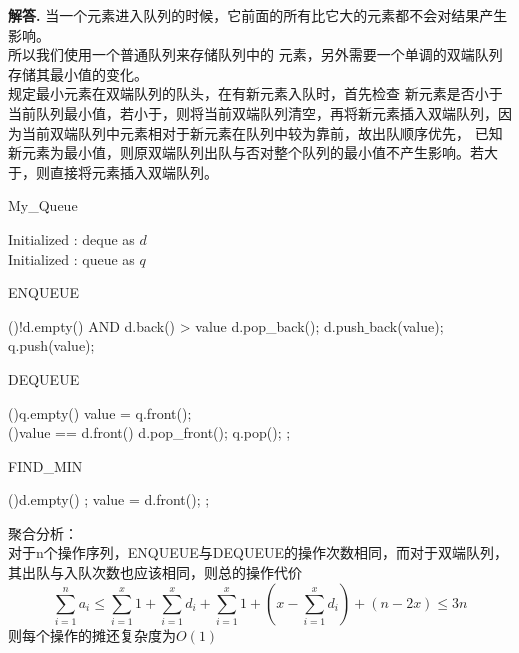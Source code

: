 \documentclass[12pt, a4paper, oneside]{ctexart}
\newenvironment{solution}{\par\noindent\textbf{解答. }}{\par}
\begin{document}
\begin{solution}
    当一个元素进入队列的时候，它前面的所有比它大的元素都不会对结果产生影响。\\所以我们使用一个普通队列来存储队列中的
    元素，另外需要一个单调的双端队列存储其最小值的变化。\\规定最小元素在双端队列的队头，在有新元素入队时，首先检查
    新元素是否小于当前队列最小值，若小于，则将当前双端队列清空，再将新元素插入双端队列，因为当前双端队列中元素相对于新元素在队列中较为靠前，故出队顺序优先，
    已知新元素为最小值，则原双端队列出队与否对整个队列的最小值不产生影响。若大于，则直接将元素插入双端队列。\\
    \begin{algorithm*}
        \caption{My\_Queue}
        \label{alg:algorithm}
        Initialized : deque as $d$\\
        Initialized : queue as $q$
    \end{algorithm*}
    \begin{algorithm*}
        \caption{ENQUEUE}
        \label{alg:algorithm}
        \While(){!d.empty() AND d.back() > value}{
            d.pop\_back();
        }
        d.push$\_$back(value);\\
        q.push(value);
    \end{algorithm*}
    \pagebreak
    \begin{algorithm*}
        \caption{DEQUEUE}
        \label{alg:algorithm}
        \If(){q.empty()}{
        }
        value = q.front();\\
        \If(){value == d.front()}{
            d.pop\_front();
        }
        q.pop();
        \BlankLine
        ;
    \end{algorithm*}
    \begin{algorithm*}
        \caption{FIND\_MIN}
        \label{alg:algorithm}
        \If(){d.empty()}{
            ;
        }
        value = d.front();
        \BlankLine
        ;
    \end{algorithm*}
    \newpage
聚合分析：\\
对于n个操作序列，ENQUEUE与DEQUEUE的操作次数相同，而对于双端队列，其出队与入队次数也应该相同，则总的操作代价
$$\sum_{i=1}^{n}a_{i}\leq \sum_{i=1}^{x}1+\sum_{i=1}^{x}d_{i}+\sum_{i=1}^{x}1+(x-\sum_{i=1}^{x}d_{i})+(n-2x)
\leq 3n$$
则每个操作的摊还复杂度为$O(1)$

\end{solution}
\end{document}
